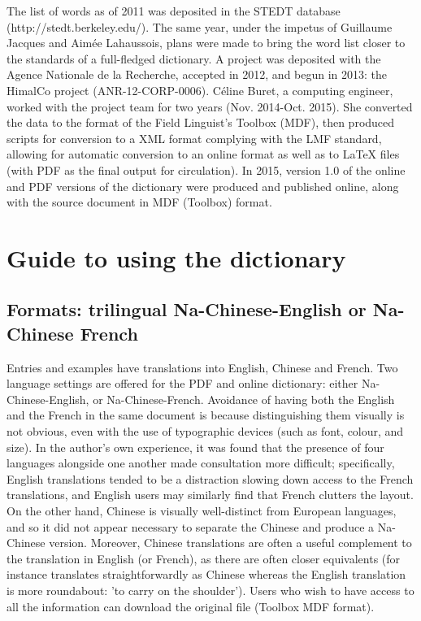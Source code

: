 The list of words as of 2011 was deposited in the STEDT database (http://stedt.berkeley.edu/). The same year, under the impetus of Guillaume Jacques and Aimée Lahaussois, plans were made to bring the word list closer to the standards of a full-fledged dictionary. A project was deposited with the Agence Nationale de la Recherche, accepted in 2012, and begun in 2013: the HimalCo project (ANR-12-CORP-0006). Céline Buret, a computing engineer, worked with the project team for two years (Nov. 2014-Oct. 2015). She converted the data to the format of the Field Linguist's Toolbox (MDF), then produced scripts for conversion to a XML format complying with the LMF standard, allowing for automatic conversion to an online format as well as to LaTeX files (with PDF as the final output for circulation). In 2015, version 1.0 of the online and PDF versions of the dictionary were produced and published online, along with the source document in MDF (Toolbox) format.

\section{Guide to using the dictionary} \label{sec:howto}

	\subsection{Formats: trilingual Na-Chinese-English or Na-Chinese French} \label{sec:versions}

Entries and examples have translations into English, Chinese and French. Two language settings are offered for the PDF and online dictionary: either Na-Chinese-English, or Na-Chinese-French. Avoidance of having both the English and the French in the same document is because distinguishing them visually is not obvious, even with the use of typographic devices (such as font, colour, and size). In the author's own experience, it was found that the presence of four languages alongside one another made consultation more difficult; specifically, English translations tended to be a distraction slowing down access to the French translations, and English users may similarly find that French clutters the layout. On the other hand, Chinese is visually well-distinct from European languages, and so it did not appear necessary to separate the Chinese and produce a Na-Chinese version. Moreover, Chinese translations are often a useful complement to the translation in English (or French), as there are often closer equivalents (for instance  translates straightforwardly as Chinese  whereas the English translation is more roundabout: 'to carry on the shoulder'). Users who wish to have access to all the information can download the original file (Toolbox MDF format). 

